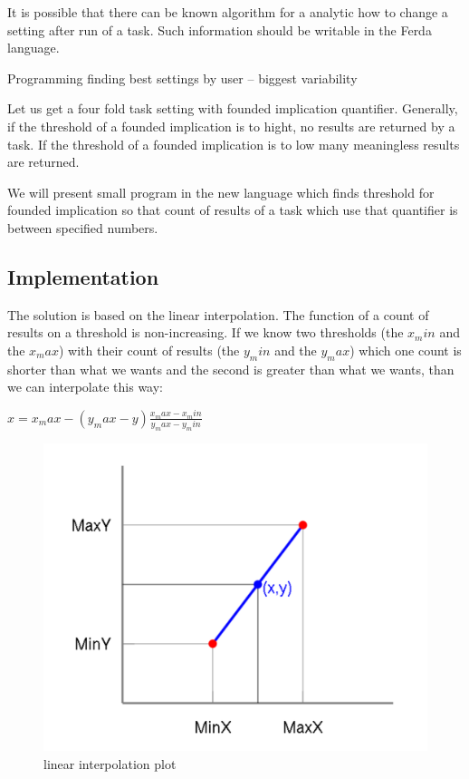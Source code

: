 \documentclass[a4paper,12pt]{book}
\begin{document}
It is possible that there can be known algorithm for a analytic how to change a setting after run of a task. Such information should be writable in the Ferda language.

Programming finding best settings by user -- biggest variability

Let us get a four fold task setting with founded implication quantifier. Generally, if the threshold of a founded implication is to hight, no results are returned by a task. If the threshold of a founded implication is to low many meaningless results are returned.

We will present small program in the new language which finds threshold for founded implication so that count of results of a task which use that quantifier is between specified numbers.

\subsection{Implementation}
The solution is based on the linear interpolation. The function of a count of results on a threshold is non-increasing. If we know two thresholds (the $x_min$ and the $x_max$) with their count of results (the $y_min$ and the $y_max$) which one count is shorter than what we wants and the second is greater than what we wants, than we can interpolate this way: 

\begin{math}
x = x_max - (y_max - y)\frac{x_max - x_min}{y_max - y_min}
\end{math}
\begin{figure}
	\includegraphics[width=13.72cm]{linearInterpolationPlot}
	\caption{linear interpolation plot}
\end{figure}
\end{document}
